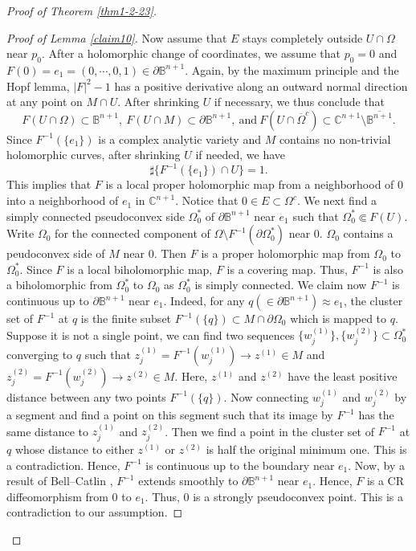 \documentclass[a4paper,centertags,oneside,12pt]{amsart}
\newcommand{\p}{\partial}
\numberwithin{equation}{section}
\begin{document}
\begin{proof}[Proof of Theorem \ref{thm1-2-23}]
\begin{proof}[Proof of Lemma \ref{claim10}]
Now assume that  $E$ stays completely outside $U\cap \Omega$ near $p_0$. 
After a holomorphic change of coordinates, we assume that $p_0=0$  and $F(0)=e_1=(0, \cdots, 0, 1)\in\partial \mathbb B^{n+1}.$ Again, by the maximum principle and the  Hopf lemma,   $|F|^2-1$   has a positive   derivative along an outward normal direction at any point on $M\cap U$. After shrinking $U$ if necessary, we thus conclude that 
\begin{equation*}
    F(U\cap \Omega)\subset\mathbb B^{n+1},~F(U\cap M)\subset\partial \mathbb B^{n+1},~\text{and}~F(U\cap\overline \Omega^c)\subset \mathbb C^{n+1}\setminus \overline{\mathbb B^{n+1}}.
\end{equation*}
Since $F^{-1}(\{e_1\})$ is a complex analytic variety and $M$ contains no non-trivial holomorphic curves, after shrinking $U$ if needed, we have $$\sharp\{F^{-1}(\{e_1\})\cap U\}=1.$$ This implies that $F$ is a local proper holomorphic map from a neighborhood of $0$ into a neighborhood of $e_1$ in $\mathbb C^{n+1}$. 
Notice that $0\in E\subset {\Omega}^c$.  We next find a simply connected pseudoconvex side $\Omega_0^\ast$  of  $\partial {\mathbb B}^{n+1}$ near  $e_1$ such that $\Omega_0^\ast \Subset F(U)$. Write $\Omega_0$ for the connected component of $\Omega\setminus F^{-1}(\partial\Omega_0^\ast)$ near $0$. 
$\Omega_0$ contains  a peudoconvex side of $M$ near $0$.  Then $F$ is a proper holomorphic map from $\Omega_0$ to $\Omega_0^\ast$. Since $F$ is a local biholomorphic map, $F$ is a covering map. Thus, $F^{-1}$ is also a biholomorphic from 
 $\Omega_0^*$ to $\Omega_0$  as $\Omega_0^*$ is simply connected.  We claim now $F^{-1}$ is continuous up to $\partial {\mathbb B}^{n+1}$ near $e_1$. Indeed, for any $q(\in \partial {\mathbb B}^{n+1})\approx e_1$, the cluster set of $F^{-1}$ at $q$ is the  finite subset $F^{-1}(\{q\})\subset  M\cap \p\Omega_0$  which is mapped to $q$. Suppose it is not a single point,  we can find two sequences $\{w_j^{(1)}\}, \{w_j^{(2)}\}\subset\Omega_0^\ast$ converging to $q$ such that $z_j^{(1)}=F^{-1}(w_j^{(1)})\rightarrow z^{(1)}\in M$ and $z_j^{(2)}=F^{-1}(w_j^{(2)})\rightarrow z^{(2)}\in M$. Here, $z^{(1)}$ and $z^{(2)}$ have the least positive distance between any two points $F^{-1}(\{q\})$. Now connecting  $w_j^{(1)}$ and $w_j^{(2)}$  by a segment and find a point on this segment  such that  its image  by $F^{-1}$ has the same distance to  $z_j^{(1)}$ and $z_j^{(2)}$. Then we find a point in the cluster set  of $F^{-1}$ at $q$  whose distance  to either $z^{(1)}$ or $z^{(2)}$ is half the original minimum one. This is a contradiction. Hence, $F^{-1}$ is continuous up to the boundary near $e_1$.
 Now, by a result of Bell--Catlin \cite{BC88}, $F^{-1}$ extends smoothly to $\p{\mathbb B}^{n+1}$ near $e_1$. Hence, $F$ is a CR diffeomorphism from $0$ to $e_1$.  Thus, $0$ is a strongly pseudoconvex point. This is a contradiction to our assumption.



\end{proof}
\end{proof}
\end{document}
